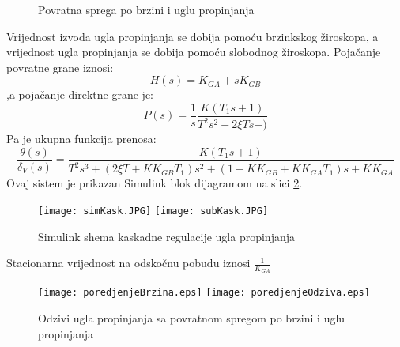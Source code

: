 \begin{figure}[!ht]
    \centering
\caption{Povratna sprega po brzini i uglu propinjanja}
\label{fig:kask}
\end{figure}
Vrijednost izvoda ugla propinjanja se dobija pomoću brzinkskog žiroskopa, a 
vrijednost ugla propinjanja se dobija pomoću slobodnog žiroskopa. Pojačanje povratne 
grane iznosi:
\begin{equation}
    H(s)=K_{GA}+sK_{GB}
\end{equation}
,a pojačanje direktne grane je:
\begin{equation}
    P(s)=\frac{1}{s}\frac{K(T_1s+1)}{T^2s^2+2\xi Ts+)}
\end{equation}
Pa je ukupna funkcija prenosa:
\begin{equation}
    \frac{\theta(s)}{\delta _V(s)} = \frac{K(T_1s+1)}{T^2s^3+
    (2\xi T+KK_{GB}T_1)s^2+(1+KK_{GB}+KK_{GA}T_1)s+KK_{GA}}
\end{equation}
Ovaj sistem je prikazan Simulink blok dijagramom na slici \ref{fig:simuKask}.
\begin{figure}[!ht]
    \centering
    \texttt{[image: simKask.JPG]}
    \texttt{[image: subKask.JPG]}
    \caption{Simulink shema kaskadne regulacije ugla propinjanja}
    \label{fig:simuKask}
\end{figure}
Stacionarna vrijednost na odskočnu pobudu iznosi $\frac{1}{K_{GA}}$
\begin{figure}[!ht]
    \centering
    \texttt{[image: poredjenjeBrzina.eps]}
    \texttt{[image: poredjenjeOdziva.eps]}
    \caption{Odzivi ugla propinjanja sa povratnom spregom po brzini i uglu propinjanja}
\end{figure}
